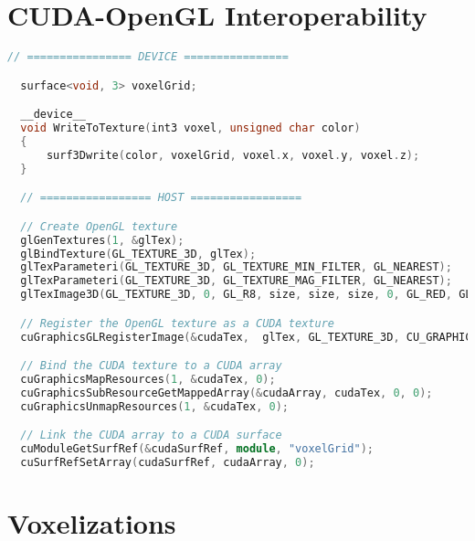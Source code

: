 \section{CUDA-OpenGL Interoperability}\label{app:cuda-opengl-inter}
\begin{lstlisting}[language=C++]
  // ================ DEVICE ================

  surface<void, 3> voxelGrid;

  __device__
  void WriteToTexture(int3 voxel, unsigned char color)
  {
      surf3Dwrite(color, voxelGrid, voxel.x, voxel.y, voxel.z);
  }

  // ================= HOST =================

  // Create OpenGL texture
  glGenTextures(1, &glTex);
  glBindTexture(GL_TEXTURE_3D, glTex);
  glTexParameteri(GL_TEXTURE_3D, GL_TEXTURE_MIN_FILTER, GL_NEAREST);
  glTexParameteri(GL_TEXTURE_3D, GL_TEXTURE_MAG_FILTER, GL_NEAREST);
  glTexImage3D(GL_TEXTURE_3D, 0, GL_R8, size, size, size, 0, GL_RED, GL_FLOAT, nullptr);

  // Register the OpenGL texture as a CUDA texture
  cuGraphicsGLRegisterImage(&cudaTex,  glTex, GL_TEXTURE_3D, CU_GRAPHICS_REGISTER_FLAGS_SURFACE_LDST);

  // Bind the CUDA texture to a CUDA array
  cuGraphicsMapResources(1, &cudaTex, 0);
  cuGraphicsSubResourceGetMappedArray(&cudaArray, cudaTex, 0, 0);
  cuGraphicsUnmapResources(1, &cudaTex, 0);

  // Link the CUDA array to a CUDA surface
  cuModuleGetSurfRef(&cudaSurfRef, module, "voxelGrid");
  cuSurfRefSetArray(cudaSurfRef, cudaArray, 0);
\end{lstlisting}

\newpage

\section{Voxelizations}\label{app:voxelizations}

\FloatBarrier


